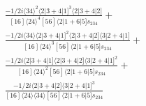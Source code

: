 \documentclass[varwidth, border=5pt]{standalone}
\begin{document}
\begin{my}
$\begin{gathered}
\scriptscriptstyle\frac{-1/2i⟨34⟩^2⟨2|3+4|1]^3⟨2|3+4|2]}{[16]⟨24⟩^4[56]⟨2|1+6|5]s_{234}}+\\
\scriptscriptstyle\frac{-1/2i⟨34⟩⟨2|3+4|1]^2⟨2|3+4|2]⟨3|2+4|1]}{[16]⟨24⟩^3[56]⟨2|1+6|5]s_{234}}+\\
\scriptscriptstyle\frac{-1/2i⟨2|3+4|1]⟨2|3+4|2]⟨3|2+4|1]^2}{[16]⟨24⟩^2[56]⟨2|1+6|5]s_{234}}+\\
\scriptscriptstyle\frac{-1/2i⟨2|3+4|2]⟨3|2+4|1]^3}{[16]⟨24⟩⟨34⟩[56]⟨2|1+6|5]s_{234}}\phantom{+}
\end{gathered}$
\end{my}
\end{document}
